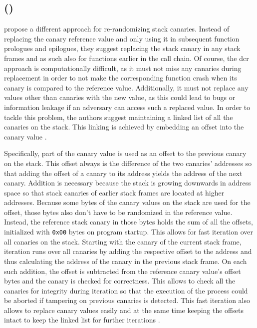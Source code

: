 \subsection{ ()}
\label{subsec:dynamic-canary-randomization}

 propose a different approach for re-randomizing stack canaries.
Instead of replacing the canary reference value and only using it in subsequent function prologues and epilogues, they suggest replacing the stack canary in any stack frames and as such also for functions earlier in the call chain.
Of course, the \gls{dcr} approach is computationally difficult, as it must not miss any canaries during replacement in order to not make the corresponding function crash when its canary is compared to the reference value.
Additionally, it must not replace any values other than canaries with the new value, as this could lead to bugs or information leakage if an adversary can access such a replaced value.
In order to tackle this problem, the authors suggest maintaining a linked list of all the canaries on the stack.
This linking is achieved by embedding an offset into the canary value \cite{Hawkins2016}.

Specifically, part of the canary value is used as an offset to the previous canary on the stack.
This offset always is the difference of the two canaries' addresses so that adding the offset of a canary to its address yields the address of the next canary.
Addition is necessary because the stack is growing downwards in address space so that stack canaries of earlier stack frames are located at higher addresses.
Because some bytes of the canary values on the stack are used for the offset, those bytes also don't have to be randomized in the reference value.
Instead, the reference stack canary in those bytes holds the sum of all the offsets, initialized with \texttt{0x00} bytes on program startup.
This allows for fast iteration over all canaries on the stack.
Starting with the canary of the current stack frame, iteration runs over all canaries by adding the respective offset to the address and thus calculating the address of the canary in the previous stack frame.
On each such addition, the offset is subtracted from the reference canary value's offset bytes and the canary is checked for correctness.
This allows to check all the canaries for integrity during iteration so that the execution of the process could be aborted if tampering on previous canaries is detected.
This fast iteration also allows to replace canary values easily and at the same time keeping the offsets intact to keep the linked list for further iterations \cite{Hawkins2016}.

